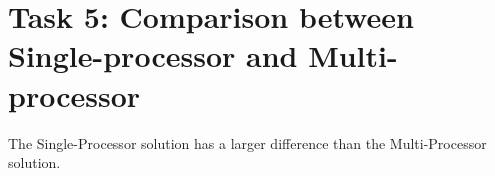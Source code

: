 \section{Task 5: Comparison between Single-processor and Multi-processor}

The Single-Processor solution has a larger difference than the Multi-Processor solution.

